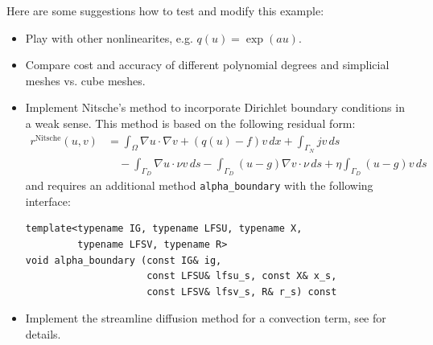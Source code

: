 \documentclass[a4paper,12pt]{article}
\begin{document}
Here are some suggestions how to test and modify this example:
\begin{itemize}
\item Play with other nonlinearites, e.g. $q(u)=\exp(au)$.
\item Compare cost and accuracy of different polynomial degrees and
simplicial meshes vs. cube meshes.
\item Implement Nitsche's method to incorporate Dirichlet boundary conditions 
in a weak sense. This method is based on the following residual form:
\begin{equation*}
\begin{split}
r^{\text{Nitsche}}(u,v) &= \int_\Omega \nabla u \cdot \nabla v + (q(u)-f)v\,dx + \int_{\Gamma_N} jv\,ds \\
&\quad - \int_{\Gamma_D} \nabla u \cdot\nu v\,ds - \int_{\Gamma_D} (u-g)\nabla v \cdot\nu\,ds 
+ \eta \int_{\Gamma_D} (u-g)v\,ds
\end{split}
\end{equation*}
and requires an additional method \lstinline{alpha_boundary} with the following interface:
\begin{lstlisting}[basicstyle=\ttfamily\small,
frame=single,
backgroundcolor=\color{listingbg}]
template<typename IG, typename LFSU, typename X, 
         typename LFSV, typename R>
void alpha_boundary (const IG& ig,
                     const LFSU& lfsu_s, const X& x_s, 
                     const LFSV& lfsv_s, R& r_s) const
\end{lstlisting}

\item Implement the streamline diffusion method for a convection term, see \cite{Elman2005} for details.
\end{itemize}



\end{document}
